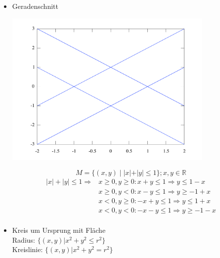 \begin{itemize}

  \item Geradenschnitt

    \begin{center}
      \includegraphics[width=0.8\textwidth]{geo_betraege.pdf}
    \end{center}

    \begin{equation*}
    M = \{(x,y)\;|\; |x|+|y| \leq 1 \}; x,y \in \mathbb{R}
    \end{equation*}
    \begin{align*}
    |x|+|y| \leq 1 \Rightarrow &x \geq 0, y \geq 0: x+y \leq 1 \Rightarrow y \leq 1-x \\
            &x \geq 0, y < 0: x-y \leq 1 \Rightarrow y \geq -1+x \\
            &x < 0, y \geq 0: -x+y \leq 1 \Rightarrow y \leq 1+x \\
            &x < 0, y < 0: -x-y \leq 1 \Rightarrow y \geq -1-x \\
    \end{align*}
  
  \item
    Kreis um Ursprung mit Fläche\\
    Radius: $\{(x,y)| x^2+y^2\leq r^2 \}$\\
    Kreislinie: $\{(x,y)| x^2+y^2 = r^2 \}$
\end{itemize}
